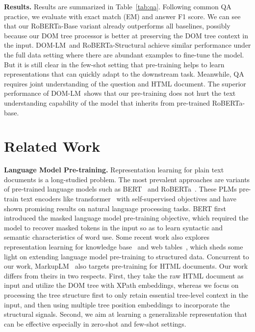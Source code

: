 \documentclass[sigconf, nonacm]{acmart}
\newcommand{\ours}[0]{DOM-LM}
\begin{document}
\vspace{0.1em}
\noindent\textbf{Results.} Results are summarized in Table~\ref{tab:qa}. Following common QA practice, we evaluate with exact match (EM) and answer F1 score. We can see that our RoBERTa-Base variant already outperforms all baselines, possibly because our DOM tree processor is better at preserving the DOM tree context in the input. \ours\ and RoBERTa-Structural achieve similar performance under the full data setting where there are abundant examples to fine-tune the model. But it is still clear in the few-shot setting that pre-training helps to learn representations that can quickly adapt to the downstream task. Meanwhile, QA requires joint understanding of the question and HTML document. The superior performance of \ours\ shows that our pre-training does not hurt the text understanding capability of the model that inherits from pre-trained RoBERTa-base.
 \section{Related Work}
\noindent\textbf{Language Model Pre-training.}
Representation learning for plain text documents is a long-studied problem. The most prevalent approaches are variants of pre-trained language models such as BERT~\cite{devlin-etal-2019-bert} and RoBERTa~\cite{liu2019roberta}. These PLMs pre-train text encoders like transformer~\cite{vaswani2017attention} with self-supervised objectives and have shown promising results on natural language processing tasks. BERT first introduced the masked language model pre-training objective, which required the model to recover masked tokens in the input so as to learn syntactic and semantic characteristics of word use. Some recent work also explores representation learning for knowledge base~\cite{Lin2015ModelingRP, Hao2019UniversalRL} and web tables~\cite{Deng2020TURLTU, Herzig2020TaPasWS}, which sheds some light on extending language model pre-training to structured data. Concurrent to our work, MarkupLM~\cite{li2021markuplm} also targets pre-training for HTML documents. Our work differs from theirs in two respects. First, they take the raw HTML document as input and utilize the DOM tree with XPath embeddings, whereas we focus on processing the tree structure first to only retain essential tree-level context in the input, and then using multiple tree position embeddings to incorporate the structural signals. Second, we aim at learning a generalizable representation that can be effective especially in zero-shot and few-shot settings.
\end{document}
